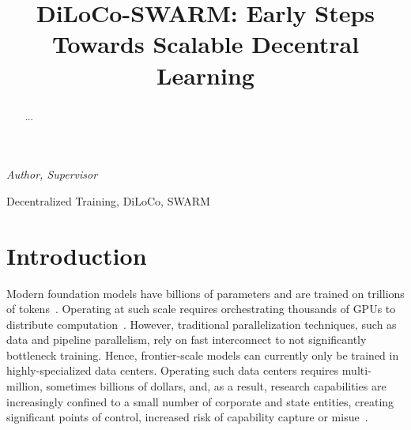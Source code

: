 \documentclass[conference, 10pt]{IEEEtran}
\begin{document}
\title{
  {\LARGE DiLoCo-SWARM: Early Steps Towards Scalable Decentral Learning}
}

\author{
  \and
  \and
  \and
}

\maketitle

{\small\itshape {} Author,  Supervisor}

\begin{abstract} 
  ...
\end{abstract}

\begin{IEEEkeywords}
Decentralized Training, DiLoCo, SWARM
\end{IEEEkeywords}

\section{Introduction} 

Modern foundation models have billions of parameters and are trained on
trillions of tokens~\cite{kaplan2020,hoffmann2022,brown2023}. Operating at such
scale requires orchestrating thousands of GPUs to distribute
computation~\cite{dubey2024,deepseekai2024}. However, traditional
parallelization techniques, such as data and pipeline parallelism, rely on fast
interconnect to not significantly bottleneck training. Hence, frontier-scale
models can currently only be trained in highly-specialized data centers.
Operating such data centers requires multi-million, sometimes billions of
dollars, and, as a result, research capabilities are increasingly confined to a
small number of corporate and state entities, creating significant points of
control, increased risk of capability capture or misue~\cite{intellect1}.
\end{document}
